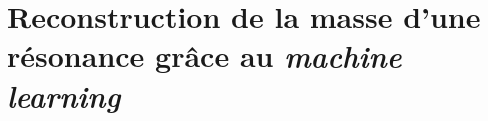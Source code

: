 \chapter{Reconstruction de la masse d'une résonance grâce au \emph{machine learning}}\label{chapter-ML}

\newpage









